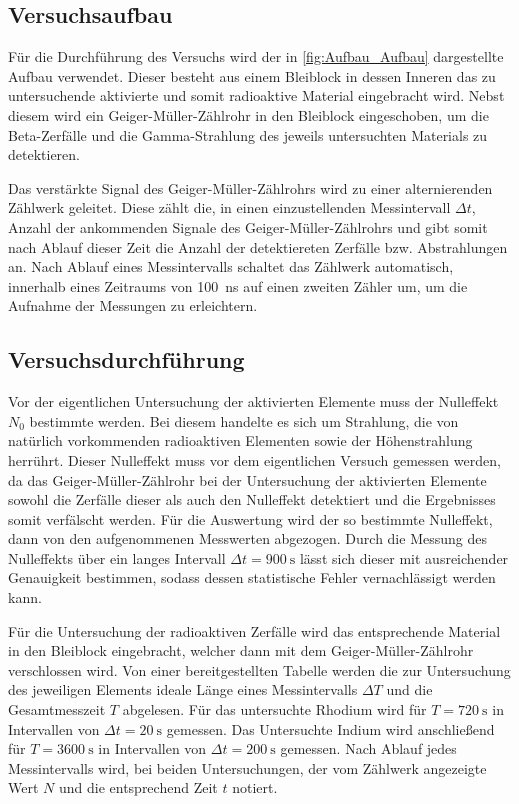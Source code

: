 \subsection{Versuchsaufbau}
	Für die Durchführung des Versuchs wird der in \cref{fig:Aufbau_Aufbau} dargestellte
	Aufbau verwendet. Dieser besteht aus einem Bleiblock in dessen Inneren das zu untersuchende
	aktivierte und somit radioaktive Material eingebracht wird. Nebst diesem wird ein 
	Geiger-Müller-Zählrohr in den Bleiblock eingeschoben, um die Beta-Zerfälle und die 
	Gamma-Strahlung des jeweils untersuchten Materials zu detektieren.
	
	Das verstärkte Signal des Geiger-Müller-Zählrohrs wird zu einer alternierenden 
	Zählwerk geleitet. Diese zählt die, in einen einzustellenden Messintervall $\Delta t$,
    Anzahl der ankommenden Signale des Geiger-Müller-Zählrohrs und gibt somit nach Ablauf 
    dieser Zeit die Anzahl der detektiereten Zerfälle bzw. Abstrahlungen an.
 	Nach Ablauf eines Messintervalls schaltet das Zählwerk automatisch,
 	innerhalb eines Zeitraums von \SI{100}{\nano\second} auf einen zweiten 
 	Zähler um, um die Aufnahme der Messungen zu erleichtern.  
    
   
\subsection{Versuchsdurchführung}
	
	Vor der eigentlichen Untersuchung der aktivierten Elemente muss der Nulleffekt $N_{0}$ bestimmte werden.
	Bei diesem handelte es sich um Strahlung, die von natürlich vorkommenden radioaktiven Elementen 
	sowie der Höhenstrahlung herrührt. Dieser Nulleffekt muss vor dem eigentlichen Versuch gemessen werden, 
	da das Geiger-Müller-Zählrohr bei der Untersuchung der aktivierten Elemente sowohl die Zerfälle dieser
	als auch den Nulleffekt detektiert und die Ergebnisses somit verfälscht werden. Für die Auswertung wird
	der so bestimmte Nulleffekt, dann von den aufgenommenen Messwerten abgezogen.  
	Durch die Messung des Nulleffekts über ein langes Intervall $\Delta t = \SI{900}{\second}$ lässt sich dieser
	mit ausreichender Genauigkeit bestimmen, sodass dessen statistische Fehler vernachlässigt werden kann.  

    Für die Untersuchung der radioaktiven Zerfälle wird das entsprechende Material in den Bleiblock eingebracht,
    welcher dann mit dem Geiger-Müller-Zählrohr verschlossen wird.
    Von einer bereitgestellten Tabelle werden die zur Untersuchung des jeweiligen Elements ideale
    Länge eines Messintervalls $\Delta T$ und die Gesamtmesszeit $T$ abgelesen. Für das untersuchte Rhodium 
    wird für $T = \SI{720}{\second}$ in Intervallen von $\Delta t = \SI{20}{\second}$ gemessen. 
    Das Untersuchte Indium wird anschließend für $T = \SI{3600}{\second}$ in Intervallen von 
    $\Delta t = \SI{200}{\second}$ gemessen.
    Nach Ablauf jedes Messintervalls wird, bei beiden Untersuchungen, der vom Zählwerk angezeigte Wert $N$ und die
    entsprechend Zeit $t$ notiert.    
      
	